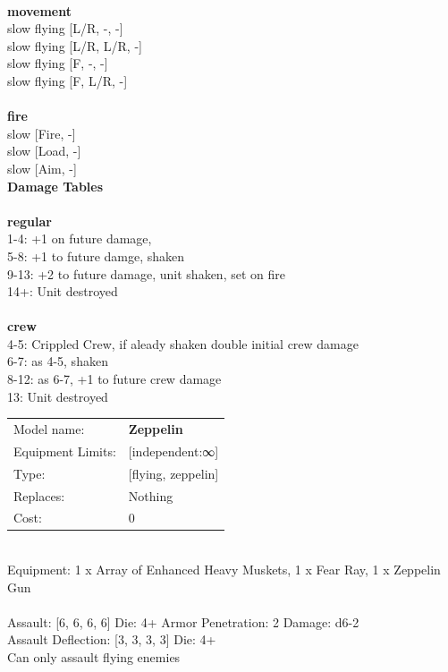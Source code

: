 \ \\ {\bf movement } \\
slow flying [L/R, -, -] \\
slow flying [L/R, L/R, -] \\
slow flying [F, -, -] \\
slow flying [F, L/R, -] \\
\ \\ {\bf fire } \\
slow [Fire, -] \\
slow [Load, -] \\
slow [Aim, -] \\


{\bf Damage Tables} \\
\ \\ {\bf regular } \\
1-4: +1 on future damage, \\
5-8: +1 to future damge, shaken \\
9-13: +2 to future damage, unit shaken, set on fire \\
14+: Unit destroyed \\
\ \\ {\bf crew } \\
4-5: Crippled Crew, if aleady shaken double initial crew damage \\
6-7: as 4-5, shaken \\
8-12: as 6-7, +1 to future crew damage \\
13: Unit destroyed \\


\noindent
\begin{tabular}{ll}
Model name: &{\bf Zeppelin } \\
Equipment Limits: &[independent:∞] \\
Type: &[flying, zeppelin] \\
Replaces: &Nothing \\
Cost: & 0\\
\end{tabular}
\ \\
Equipment: 1 x Array of Enhanced Heavy Muskets, 1 x Fear Ray, 1 x Zeppelin Gun \\
\ \\
Assault: [6, 6, 6, 6] Die: 4+ Armor Penetration: 2 Damage: d6-2 \\
Assault Deflection: [3, 3, 3, 3] Die: 4+\\
\indent Can only assault flying enemies\\ 
 
\ \\


